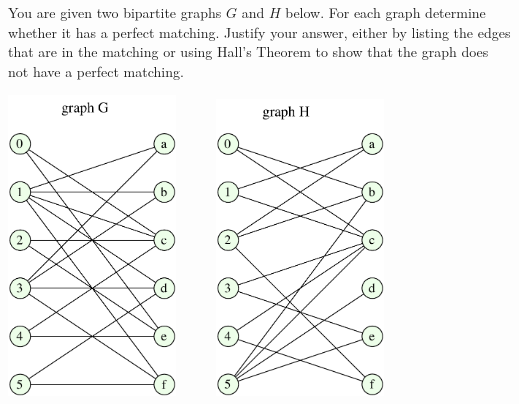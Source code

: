 \documentclass{article}
\begin{document}
\begin{problem}
	You are given two bipartite graphs $G$ and $H$ below. For each
	graph determine whether it has a perfect matching.
	Justify your answer, either by 
	listing the edges that are in the matching or using
	Hall's Theorem to show that the graph does not have a
	perfect matching.

	\begin{center}
	\includegraphics[width = 1.75in]{bipartite_graphG_hw5.pdf}
	\ \ \ \ \
	\includegraphics[width = 1.75in]{bipartite_graphH_hw5.pdf}
	\end{center}
\end{problem}


\end{document}
